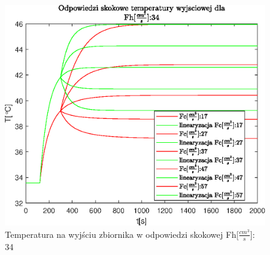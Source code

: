 \begin{figure}[h!]
   \centering
   \includegraphics{img/step-responses/Tout/stepResponseToutFh34.eps}
   \caption{Temperatura na wyjściu zbiornika w odpowiedzi skokowej Fh[$\frac{cm^3}{s}$]: 34}
   \label{fig:stepResponseToutFh34}
\end{figure}
            
